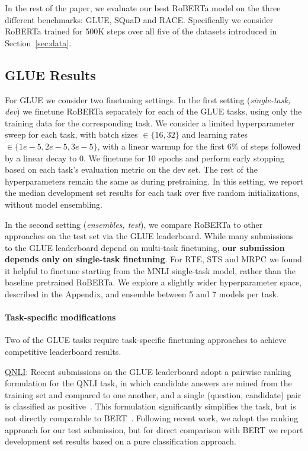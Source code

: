 In the rest of the paper, we evaluate our best RoBERTa model on the three different benchmarks: GLUE, SQuaD and RACE. Specifically we consider RoBERTa trained for 500K steps over all five of the datasets introduced in Section~\ref{sec:data}.

\subsection{GLUE Results} \label{sec:results_glue}

For GLUE we consider two finetuning settings. In the first setting (\emph{single-task, dev}) we finetune RoBERTa separately for each of the GLUE tasks, using only the training data for the corresponding task. We consider a limited hyperparameter sweep for each task, with batch sizes $\in \{16, 32\}$ and learning rates $\in \{1e-5, 2e-5, 3e-5\}$, with a linear warmup for the first 6\% of steps followed by a linear decay to 0. We finetune for 10 epochs and perform early stopping based on each task's evaluation metric on the dev set. The rest of the hyperparameters remain the same as during pretraining. In this setting, we report the median development set results for each task over five random initializations, without model ensembling.

In the second setting (\emph{ensembles, test}), we compare RoBERTa to other approaches on the test set via the GLUE leaderboard. While many submissions to the GLUE leaderboard depend on multi-task finetuning, \textbf{our submission depends only on single-task finetuning}. For RTE, STS and MRPC we found it helpful to finetune starting from the MNLI single-task model, rather than the baseline pretrained RoBERTa. We explore a slightly wider hyperparameter space, described in the Appendix, and ensemble between 5 and 7 models per task.

\paragraph{Task-specific modifications}

Two of the GLUE tasks require task-specific finetuning approaches to achieve competitive leaderboard results.

\underline{QNLI}:
Recent submissions on the GLUE leaderboard adopt a pairwise ranking formulation for the QNLI task, in which candidate answers are mined from the training set and compared to one another, and a single (question, candidate) pair is classified as positive~\cite{liu2019mtdnn,liu2019improving,yang2019xlnet}. This formulation significantly simplifies the task, but is not directly comparable to BERT~\cite{devlin2018bert}. Following recent work, we adopt the ranking approach for our test submission, but for direct comparison with BERT we report development set results based on a pure classification approach.

